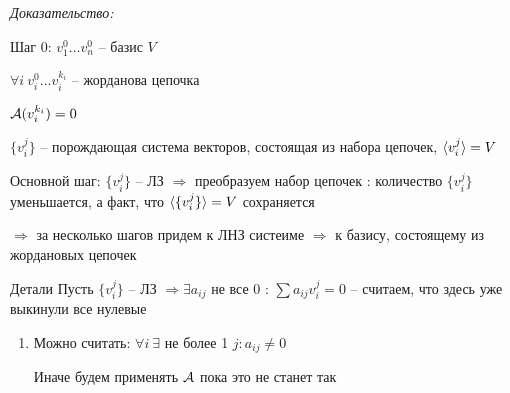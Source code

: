 \documentclass[12pt]{article}
\begin{document}
\textit{Доказательство:}

Шаг 0: $v_1^0 \ldots v_n^0$ -- базис $V$

$\forall i\ v_i^0 \ldots v_i^{k_i}$ -- жорданова цепочка

$\mathcal{A}(v_i^{k_i}) = 0$

$\{ v_i^j \}$ -- порождающая система векторов, состоящая из набора цепочек, $\langle v_i^j \rangle = V$

Основной шаг: $\{v_i^j \}$ -- ЛЗ $\Rightarrow$ преобразуем набор цепочек : количество $\{v_i^j\}$ уменьшается, а факт, что $\langle \{v_i^j\} \rangle = V$ сохраняется

$\Rightarrow$ за несколько шагов придем к ЛНЗ систеиме $\Rightarrow$ к базису, состоящему из жордановых цепочек

\begin{nota}{Детали}
    Пусть $\{v_i^j\}$ -- ЛЗ $\Rightarrow \exists a_{ij}$ не все 0 : $\sum a_{ij}v_i^j = 0$ -- считаем, что здесь уже выкинули все нулевые

    \begin{enumerate}
        \item Можно считать: $\forall i\ \exists$ не более 1 $j : a_{ij} \neq 0$
        
        Иначе будем применять $\mathcal{A}$ пока это не станет так 
    \end{enumerate}
\end{nota}
\end{document}
